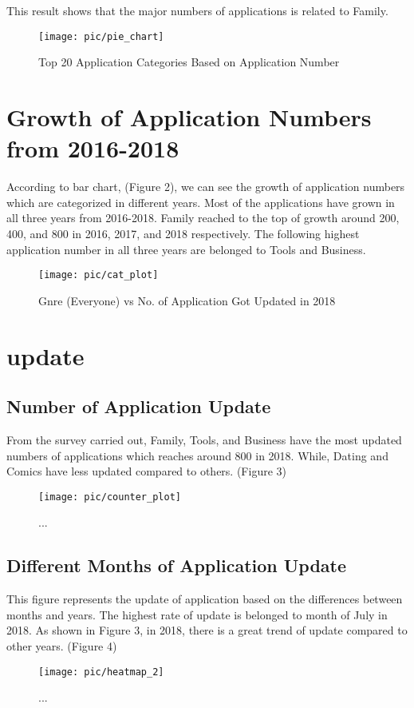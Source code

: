 This result shows that the major numbers of applications is related to Family.
\begin{figure}
\centering
\texttt{[image: pic/pie\_chart]}
\caption{Top 20 Application Categories Based on Application Number}
\label{fig:1}
\end{figure}

\section*{Growth of Application Numbers from 2016-2018}
According to bar chart, (Figure 2), we can see the growth of application numbers which are categorized in different years. Most of the applications have grown in all three years from 2016-2018.
Family reached to the top of growth around 200, 400, and 800 in 2016, 2017, and 2018 respectively. The following highest application number in all three years are belonged to Tools and Business.

\begin{figure}
\centering
\texttt{[image: pic/cat\_plot]}
\caption{Gnre (Everyone) vs No. of Application Got Updated in 2018} 
\label{fig:2}
\end{figure}	

\section*{update}
\subsection*{Number of Application Update}
From the survey carried out, Family, Tools, and Business have the most updated numbers of applications which reaches around 800 in 2018. While, Dating and Comics have less updated compared to others. (Figure 3)  
\begin{figure}
\centering
\texttt{[image: pic/counter\_plot]}
\caption{... }
\label{fig:3}
\end{figure}

\subsection*{Different Months of Application Update}
This figure represents the update of application based on the differences between months and years. The highest rate of update is belonged to month of July in 2018. As shown in Figure 3, in 2018, there is a great trend of update compared to other years. (Figure 4)
\begin{figure}
\centering
\texttt{[image: pic/heatmap\_2]}
\caption{... }
\label{fig:4}
\end{figure}

